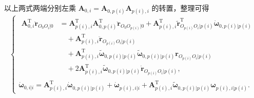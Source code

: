 以上两式两端分别左乘 $\boldsymbol{A}_{0,i} = \boldsymbol{A}_{0,p(i)} \boldsymbol{A}_{p(i),i}$ 的转置，整理可得
\begin{equation}\label{eq:11.48}
\begin{cases}
\begin{aligned}
\boldsymbol{A}_{0,i}^{\mathrm{T}} \ddot{\boldsymbol{r}}_{O_0O_i|0}
&= \boldsymbol{A}_{p(i),i}^{\mathrm{T}} \boldsymbol{A}_{0,p(i)}^{\mathrm{T}} \ddot{\boldsymbol{r}}_{O_0O_{p(i)}|0}
   + \boldsymbol{A}_{p(i),i}^{\mathrm{T}} \tilde{\boldsymbol{r}}_{O_{p(i)}O_i|p(i)}^{\mathrm{T}} \dot{\boldsymbol{\omega}}_{0,p(i)|p(i)} \\[3pt]
&\quad + \boldsymbol{A}_{p(i),i}^{\mathrm{T}} \ddot{\boldsymbol{r}}_{O_{p(i)}O_i|p(i)} \\[3pt]
&\quad + \boldsymbol{A}_{p(i),i}^{\mathrm{T}} \tilde{\boldsymbol{\omega}}_{0,p(i)|p(i)} \tilde{\boldsymbol{\omega}}_{0,p(i)|p(i)} \boldsymbol{r}_{O_{p(i)}O_i|p(i)} \\[3pt]
&\quad + 2 \boldsymbol{A}_{p(i),i}^{\mathrm{T}} \tilde{\boldsymbol{\omega}}_{0,p(i)|p(i)} \dot{\boldsymbol{r}}_{O_{p(i)}O_i|p(i)},
\end{aligned} \\[16pt]
\dot{\boldsymbol{\omega}}_{0,i|i} = \boldsymbol{A}_{p(i),i}^{\mathrm{T}} \dot{\boldsymbol{\omega}}_{0,p(i)|p(i)} + \dot{\boldsymbol{\omega}}_{p(i),i|i}
   + \boldsymbol{A}_{p(i),i}^{\mathrm{T}} \tilde{\boldsymbol{\omega}}_{0,p(i)|p(i)} \boldsymbol{\omega}_{p(i),i|p(i)}.
\end{cases}
\end{equation}

